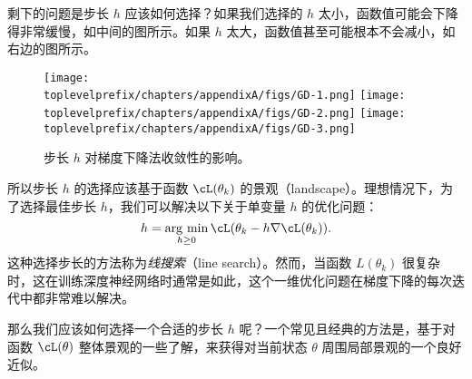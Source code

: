 \documentclass[../../book-main.tex]{subfiles}
\begin{document}
剩下的问题是步长 \(h\) 应该如何选择？如果我们选择的 \(h\) 太小，函数值可能会下降得非常缓慢，如中间的图所示。如果 \(h\) 太大，函数值甚至可能根本不会减小，如右边的图所示。

\begin{figure}[h]
    \centering
    \texttt{[image: \\toplevelprefix/chapters/appendixA/figs/GD-1.png]}
    \hspace{3mm}
    \texttt{[image: \\toplevelprefix/chapters/appendixA/figs/GD-2.png]}
    \hspace{3mm}
    \texttt{[image: \\toplevelprefix/chapters/appendixA/figs/GD-3.png]}
    \caption{步长 \(h\) 对梯度下降法收敛性的影响。}
    \label{fig:step-size}
\end{figure}

所以步长 \(h\) 的选择应该基于函数 \(\cL(\theta_k)\) 的景观（landscape）。理想情况下，为了选择最佳步长 \(h\)，我们可以解决以下关于单变量 \(h\) 的优化问题：
\begin{equation}
    h = \argmin_{h\geq 0} \cL(\theta_k - h\nabla \cL(\theta_k)).
\end{equation}
这种选择步长的方法称为\textit{线搜索}（line search）。然而，当函数 \(L(\theta_k)\) 很复杂时，这在训练深度神经网络时通常是如此，这个一维优化问题在梯度下降的每次迭代中都非常难以解决。

那么我们应该如何选择一个合适的步长 \(h\) 呢？一个常见且经典的方法是，基于对函数 \(\cL(\theta)\) 整体景观的一些了解，来获得对当前状态 \(\theta\) 周围局部景观的一个良好近似。
\end{document}
